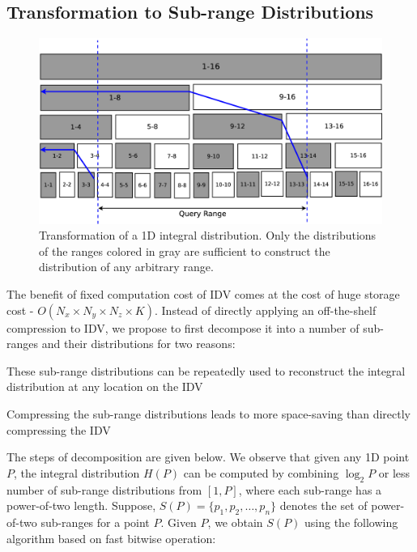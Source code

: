 \subsection{Transformation to Sub-range Distributions}
\label{subsec:ih_decomp}
\begin{figure}[tb]
\centering
	\includegraphics[width = \linewidth, keepaspectratio = true]{images/eps/ih_octree_ih.eps}
	\caption{Transformation of a 1D integral distribution. Only the distributions of the ranges colored in gray are sufficient to construct the distribution of any arbitrary range.}	
	\label{fig:ih_octree}
\end{figure}
The benefit of fixed computation cost of IDV comes at the cost of huge storage cost - $O(N_x\times N_y\times N_z\times K)$. Instead of directly applying an off-the-shelf compression to IDV, we propose to first decompose it into a number of sub-ranges and their distributions for two reasons:
\begin{packed_itemize}
\item These sub-range distributions can be repeatedly used to reconstruct the integral distribution at any location on the IDV
\item Compressing the sub-range distributions leads to more space-saving than directly compressing the IDV
\end{packed_itemize}
The steps of decomposition are given below. We observe that given any 1D point $P$, the integral distribution $H(P)$ can be computed by combining $\log_2 P$ or less number of sub-range distributions from $[1,P]$, where each sub-range has a power-of-two length. Suppose, $S(P) = \{p_1, p_2, \ldots, p_n\}$ denotes the set of power-of-two sub-ranges for a point $P$. Given $P$, we obtain $S(P)$ using the following algorithm based on fast bitwise operation:
